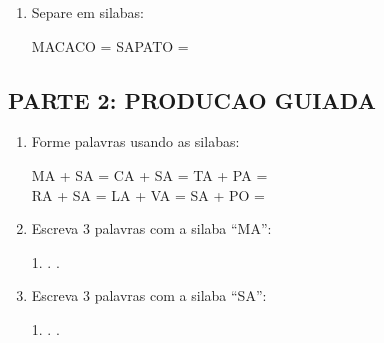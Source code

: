 \begin{exercicio}
\begin{enumerate}
  \item Separe em silabas:
  \begin{center}
  MACACO = \underline{\hspace{1cm}} \underline{\hspace{1cm}} \underline{\hspace{1cm}} \quad SAPATO = \underline{\hspace{1cm}} \underline{\hspace{1cm}} \underline{\hspace{1cm}}
  \end{center}
\end{enumerate}

\subsection*{PARTE 2: PRODUCAO GUIADA}

\begin{enumerate}[resume]
  \item Forme palavras usando as silabas:
  \begin{center}
  MA + SA = \underline{\hspace{2cm}} \quad CA + SA = \underline{\hspace{2cm}} \quad TA + PA = \underline{\hspace{2cm}}\\[0.5em]
  RA + SA = \underline{\hspace{2cm}} \quad LA + VA = \underline{\hspace{2cm}} \quad SA + PO = \underline{\hspace{2cm}}
  \end{center}

  \item Escreva 3 palavras com a silaba ``MA'':
  \begin{center}
  1. \underline{\hspace{3cm}} . \underline{\hspace{3cm}} . \underline{\hspace{3cm}}
  \end{center}

  \item Escreva 3 palavras com a silaba ``SA'':
  \begin{center}
  1. \underline{\hspace{3cm}} . \underline{\hspace{3cm}} . \underline{\hspace{3cm}}
  \end{center}


\end{enumerate}
\end{exercicio}
